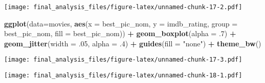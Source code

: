 \documentclass[]{article}
\newenvironment{Shaded}{\begin{snugshade}}{\end{snugshade}}
\newcommand{\KeywordTok}[1]{\textcolor[rgb]{0.13,0.29,0.53}{\textbf{#1}}}
\newcommand{\DataTypeTok}[1]{\textcolor[rgb]{0.13,0.29,0.53}{#1}}
\newcommand{\DecValTok}[1]{\textcolor[rgb]{0.00,0.00,0.81}{#1}}
\newcommand{\StringTok}[1]{\textcolor[rgb]{0.31,0.60,0.02}{#1}}
\newcommand{\OperatorTok}[1]{\textcolor[rgb]{0.81,0.36,0.00}{\textbf{#1}}}
\newcommand{\NormalTok}[1]{#1}
\begin{document}
\texttt{[image: final\_analysis\_files/figure-latex/unnamed-chunk-17-2.pdf]}

\begin{Shaded}
\begin{Highlighting}[]
\KeywordTok{ggplot}\NormalTok{(}\DataTypeTok{data=}\NormalTok{movies, }\KeywordTok{aes}\NormalTok{(}\DataTypeTok{x =}\NormalTok{ best_pic_nom, }\DataTypeTok{y =}\NormalTok{ imdb_rating, }\DataTypeTok{group =}\NormalTok{ best_pic_nom, }\DataTypeTok{fill =}\NormalTok{ best_pic_nom)) }\OperatorTok{+}\StringTok{ }\KeywordTok{geom_boxplot}\NormalTok{(}\DataTypeTok{alpha =}\NormalTok{ .}\DecValTok{7}\NormalTok{) }\OperatorTok{+}\StringTok{ }\KeywordTok{geom_jitter}\NormalTok{(}\DataTypeTok{width =}\NormalTok{ .}\DecValTok{05}\NormalTok{, }\DataTypeTok{alpha =}\NormalTok{ .}\DecValTok{4}\NormalTok{) }\OperatorTok{+}\StringTok{ }\KeywordTok{guides}\NormalTok{(}\DataTypeTok{fill =} \StringTok{"none"}\NormalTok{) }\OperatorTok{+}\StringTok{ }\KeywordTok{theme_bw}\NormalTok{()}
\end{Highlighting}
\end{Shaded}

\texttt{[image: final\_analysis\_files/figure-latex/unnamed-chunk-17-3.pdf]}

\begin{Shaded}
\end{Shaded}

\texttt{[image: final\_analysis\_files/figure-latex/unnamed-chunk-18-1.pdf]}

\begin{Shaded}
\end{Shaded}
\end{document}
